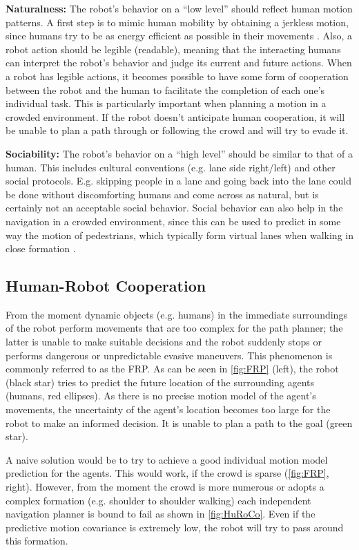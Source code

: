 \textbf{Naturalness: }
The robot's behavior on a ``low level'' should reflect human motion patterns. A first step is to mimic human mobility by obtaining a jerkless motion, since humans try to be as energy efficient as possible in their movements \cite{ArechavaletaEtAl2008}. Also, a robot action should be legible (readable), meaning that the interacting humans can interpret the robot's behavior and judge its current and future actions. When a robot has legible actions, it becomes possible to have some form of cooperation between the robot and the human to facilitate the completion of each one's individual task. This is particularly important when planning a motion in a crowded environment. If the robot doesn't anticipate human cooperation, it will be unable to plan a path through or following the crowd and will try to evade it.

\textbf{Sociability: }
The robot's behavior on a ``high level'' should be similar to that of a human. This includes cultural conventions (e.g. lane side right/left) and other social protocols. E.g. skipping people in a lane and going back into the lane could be done without discomforting humans and come across as natural, but is certainly not an acceptable social behavior. Social behavior can also help in the navigation in a crowded environment, since this can be used to predict in some way the motion of pedestrians, which typically form virtual lanes when walking in close formation \cite{Helbing1991}.

\subsection{Human-Robot Cooperation} \label{sec:HRCrev}
From the moment dynamic objects (e.g. humans) in the immediate surroundings of the robot perform movements that are too complex for the path planner; the latter is unable to make suitable decisions and the robot suddenly stops or performs dangerous or unpredictable evasive maneuvers. This phenomenon is commonly referred to as the FRP. As can be seen in \cref{fig:FRP} (left), the robot (black star) tries to predict the future location of the surrounding agents (humans, red ellipses). As there is no precise motion model of the agent's movements, the uncertainty of the agent's location becomes too large for the robot to make an informed decision. It is unable to plan a path to the goal (green star).

A naive solution would be to try to achieve a good individual motion model prediction for the agents. This would work, if the crowd is sparse (\cref{fig:FRP}, right). However, from the moment the crowd is more numerous or adopts a complex formation (e.g. shoulder to shoulder walking) each independent navigation planner is bound to fail as shown in \cref{fig:HuRoCo}. Even if the predictive motion covariance is extremely low, the robot will try to pass around this formation.


